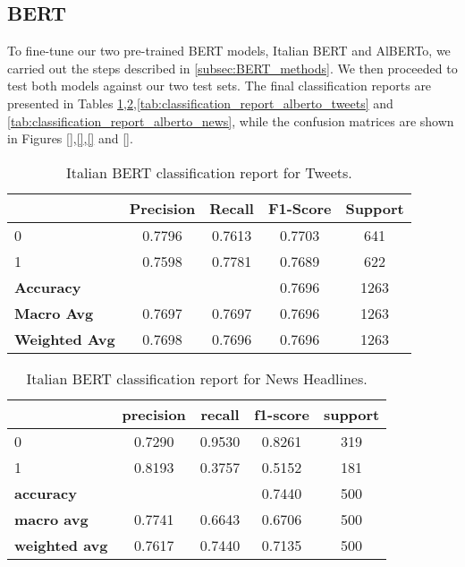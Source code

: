 \subsection{BERT}
\label{subsec:BERT_results}
To fine-tune our two pre-trained BERT models, Italian BERT and AlBERTo, we carried out the steps described in \ref{subsec:BERT_methods}. We then proceeded to test both models against our two test sets. The final classification reports are presented in Tables \ref{tab:classification_report_bert_base_tweets},\ref{tab:classification_report_bert_base_news},\ref{tab:classification_report_alberto_tweets} and \ref{tab:classification_report_alberto_news}, while the confusion matrices are shown in Figures \ref{},\ref{},\ref{} and \ref{}.

\begin{table}[h]
    \centering
    \begin{tabular}{lcccc}
        \toprule
        & \textbf{Precision} & \textbf{Recall} & \textbf{F1-Score} & \textbf{Support} \\
        \midrule
        0 & 0.7796 & 0.7613 & 0.7703 & 641 \\
        1 & 0.7598 & 0.7781 & 0.7689 & 622 \\
        \midrule
        \textbf{Accuracy} & & & 0.7696 & 1263 \\
        \textbf{Macro Avg} & 0.7697 & 0.7697 & 0.7696 & 1263 \\
        \textbf{Weighted Avg} & 0.7698 & 0.7696 & 0.7696 & 1263 \\
        \bottomrule
    \end{tabular}
    \caption{Italian BERT classification report for Tweets.}
    \label{tab:classification_report_bert_base_tweets}
\end{table}

\begin{table}[h]
    \centering
    \begin{tabular}{lcccc}
        \toprule
        & \textbf{precision} & \textbf{recall} & \textbf{f1-score} & \textbf{support} \\
        \midrule
        0 & 0.7290 & 0.9530 & 0.8261 & 319 \\
        1 & 0.8193 & 0.3757 & 0.5152 & 181 \\
        \midrule
        \textbf{accuracy} & & & 0.7440 & 500 \\
        \textbf{macro avg} & 0.7741 & 0.6643 & 0.6706 & 500 \\
        \textbf{weighted avg} & 0.7617 & 0.7440 & 0.7135 & 500 \\
        \bottomrule
    \end{tabular}
    \caption{Italian BERT classification report for News Headlines.}
    \label{tab:classification_report_bert_base_news}
\end{table}

